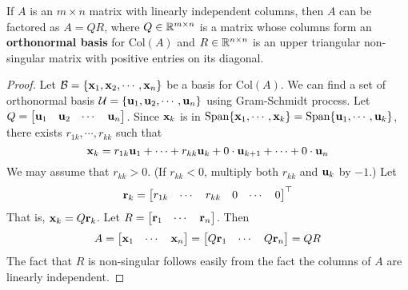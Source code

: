     \begin{Thm}
        If $A$ is an $m\times n$ matrix with linearly independent columns, then $A$ can be factored as $A = QR$, where $Q\in\mathbb{R}^{m\times n}$ is a matrix whose columns form an \textbf{orthonormal basis} for $\text{Col}(A)$ and $R\in\mathbb{R}^{n \times n}$ is an upper triangular non-singular matrix with positive entries on its diagonal.
        \begin{proof}
            Let $\mathcal{B} = \{\mathbf{x}_1, \mathbf{x}_2,\cdots, \mathbf{x}_n \}$ be a basis for $\text{Col}(A)$. We can find a set of orthonormal basis $\mathcal{U} =  \{ \mathbf{u}_1, \mathbf{u}_2, \cdots, \mathbf{u}_n \}$ using Gram-Schmidt process. Let $Q = \begin{bmatrix}
                \mathbf{u}_1 &\mathbf{u}_2 &\cdots & \mathbf{u}_n
            \end{bmatrix}$. Since $\mathbf{x}_k$ is in $\text{Span}\{\mathbf{x}_1, \cdots, \mathbf{x}_k \} = \text{Span}\{\mathbf{u}_1, \cdots, \mathbf{u}_k \}$, there exists $r_{1k},\cdots, r_{kk}$ such that
            \begin{equation}
                \mathbf{x}_k = r_{1k}\mathbf{u}_1 + \cdots + r_{kk}\mathbf{u}_k + 0\cdot \mathbf{u}_{k + 1} + \cdots + 0\cdot \mathbf{u}_{n}
            \end{equation}  
            We may assume that $r_{kk} > 0$. (If $r_{kk} < 0$, multiply both $r_{kk}$ and $\mathbf{u}_k$ by $-1$.) Let 
            \begin{equation*}
                \mathbf{r}_k = \begin{bmatrix}
                    r_{1k} & \cdots & r_{kk} & 0 & \cdots & 0
                \end{bmatrix}^\top
            \end{equation*}
            That is, $\mathbf{x}_k = Q\mathbf{r}_k$. Let $R = \begin{bmatrix}
                \mathbf{r}_1 & \cdots & \mathbf{r}_n
            \end{bmatrix}$. Then
            \begin{equation*}
                A = \begin{bmatrix}
                    \mathbf{x}_1 & \cdots & \mathbf{x}_n
                \end{bmatrix} = \begin{bmatrix}
                    Q\mathbf{r}_1 & \cdots & Q\mathbf{r}_n
                \end{bmatrix} = QR
            \end{equation*} The fact that $R$ is non-singular follows easily from the fact the columns of $A$ are linearly independent.
        \end{proof}
    \end{Thm}

    